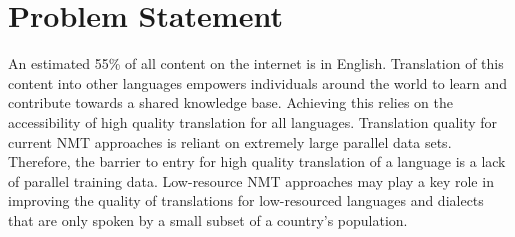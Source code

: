%
%
%
%
%


\section{Problem Statement}
An estimated 55\% of all content on the internet is in English. Translation of this content into other languages empowers individuals around the world to learn and contribute towards a shared knowledge base. Achieving this relies on the accessibility of high quality translation for all languages. Translation quality for current \acrshort{NMT} approaches is reliant on extremely large parallel data sets. Therefore, the barrier to entry for high quality translation of a language is a lack of parallel training data. Low-resource \acrshort{NMT} approaches may play a key role in improving the quality of translations for low-resourced languages and dialects that are only spoken by a small subset of a country's population.

